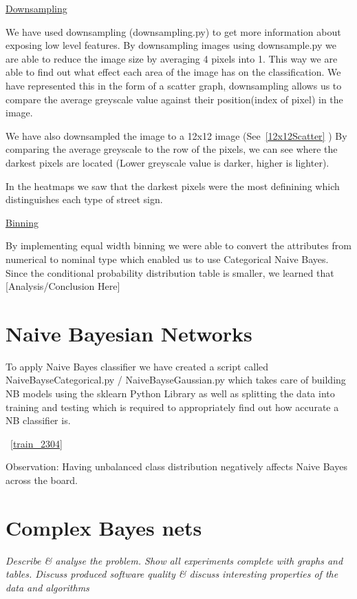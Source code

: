 \documentclass[11pt]{article}
\begin{document}
\underline{Downsampling}
\par
We have used downsampling (downsampling.py) to get more information about exposing low level features.
By downsampling images using downsample.py we are able to reduce the image size by averaging 4 pixels into 1. This way we are able to find out what effect each area of the image has on the classification.
We have represented this in the form of a scatter graph, downsampling allows us to compare the average
greyscale value against their position(index of pixel) in the image.
\par 
We have also downsampled the image to a 12x12 image (See~\ref{12x12Scatter} )
By comparing the average greyscale to the row of the pixels, we can see where the
darkest pixels are located (Lower greyscale value is darker, higher is lighter).
\par
In the heatmaps we saw that the darkest pixels were the most definining which distinguishes 
each type of street sign.
\par
\underline{Binning}
\par
By implementing equal width binning we were able to convert the attributes from numerical to nominal type which enabled us to use Categorical Naive Bayes. 
Since the conditional probability distribution table is smaller, we learned that {\huge [Analysis/Conclusion Here]}

\pagebreak

\section{Naive Bayesian Networks}
To apply Naive Bayes classifier we have created a script called NaiveBayseCategorical.py 
/ NaiveBayseGaussian.py which takes care of building NB models using the sklearn Python Library
as well as splitting the data into training and testing which is required to appropriately find 
out how accurate a NB classifier is.
\par 
~\ref{train_2304}
\par
Observation: Having unbalanced class distribution negatively affects Naive Bayes across the board.


\pagebreak

\section{Complex Bayes nets}
\par
\emph{Describe \& analyse the problem. Show all experiments complete with graphs and tables. Discuss produced software quality \& discuss interesting properties of the data and algorithms}
\end{document}
